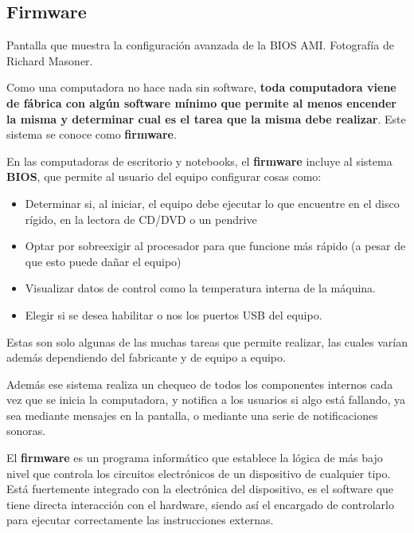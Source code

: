 \subsection{Firmware}
\label{chap:computadoras:subsec:firmware}

{Pantalla que muestra la configuración avanzada de la BIOS AMI.} {Fotografía de
Richard Masoner.}

Como una computadora no hace nada sin software, \textbf{toda computadora viene
de fábrica con algún software mínimo que permite al menos encender la misma y
determinar cual es el tarea que la misma debe realizar}. Este sistema se conoce
como \textbf{firmware}.\autocite[vid.]{mw_firmware_2018}

En las computadoras de escritorio y notebooks, el \textbf{firmware} incluye al
sistema \textbf{BIOS}, que permite al usuario del equipo configurar cosas como:
\begin{itemize}
    \item Determinar si, al iniciar, el equipo debe ejecutar lo que encuentre en
        el disco rígido, en la lectora de CD/DVD o un pendrive
    \item Optar por sobreexigir al procesador para que funcione más rápido (a
        pesar de que esto puede dañar el equipo)
    \item Visualizar datos de control como la temperatura interna de la máquina.
    \item Elegir si se desea habilitar o nos los puertos USB del equipo.
\end{itemize}
Estas son solo algunas de las muchas tareas que permite realizar, las cuales
varían además dependiendo del fabricante y de equipo a equipo.

Además ese sistema realiza un chequeo de todos los componentes internos cada vez
que se inicia la computadora, y notifica a los usuarios si algo está fallando,
ya sea mediante mensajes en la pantalla, o mediante una serie de notificaciones
sonoras.

\begin{definition} El \textbf{firmware} es un programa
    informático que establece la lógica de más bajo nivel que controla los
    circuitos electrónicos de un dispositivo de cualquier tipo. Está fuertemente
    integrado con la electrónica del dispositivo, es el software que tiene
    directa interacción con el hardware, siendo así el encargado de controlarlo
    para ejecutar correctamente las instrucciones externas.\autocite[vid. p.
    185]{laplante_2000}
    \autocite[p. 192]{downing_2009}
\end{definition}

